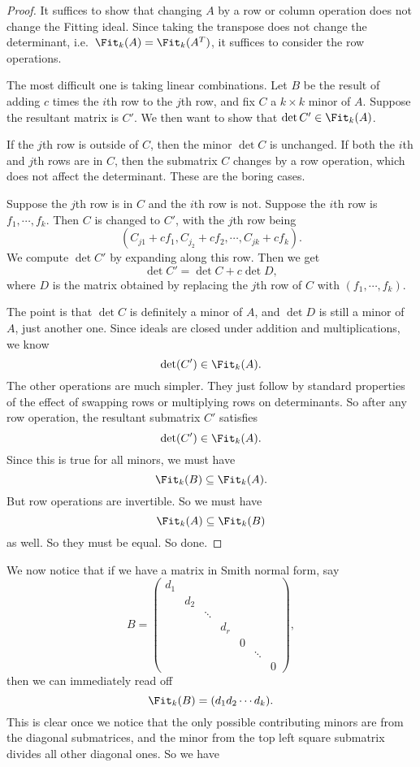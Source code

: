 \documentclass[a4paper]{article}
\begin{document}
\begin{proof}
  It suffices to show that changing $A$ by a row or column operation does not change the Fitting ideal. Since taking the transpose does not change the determinant, i.e.\ $\Fit_k(A) = \Fit_k(A^T)$, it suffices to consider the row operations.

  The most difficult one is taking linear combinations. Let $B$ be the result of adding $c$ times the $i$th row to the $j$th row, and fix $C$ a $k \times k$ minor of $A$. Suppose the resultant matrix is $C'$. We then want to show that $\det C' \in \Fit_k(A)$.

  If the $j$th row is outside of $C$, then the minor $\det C$ is unchanged. If both the $i$th and $j$th rows are in $C$, then the submatrix $C$ changes by a row operation, which does not affect the determinant. These are the boring cases.

  Suppose the $j$th row is in $C$ and the $i$th row is not. Suppose the $i$th row is $f_1, \cdots, f_k$. Then $C$ is changed to $C'$, with the $j$th row being
  \[
    (C_{j1} + c f_1, C_{j_2} + c f_2, \cdots, C_{jk} + c f_k).
  \]
  We compute $\det C'$ by expanding along this row. Then we get
  \[
    \det C'= \det C + c\det D,
  \]
  where $D$ is the matrix obtained by replacing the $j$th row of $C$ with $(f_1, \cdots, f_k)$.

  The point is that $\det C$ is definitely a minor of $A$, and $\det D$ is still a minor of $A$, just another one. Since ideals are closed under addition and multiplications, we know
  \[
    \det (C') \in \Fit_k(A).
  \]
  The other operations are much simpler. They just follow by standard properties of the effect of swapping rows or multiplying rows on determinants. So after any row operation, the resultant submatrix $C'$ satisfies
  \[
    \det (C') \in \Fit_k(A).
  \]
  Since this is true for all minors, we must have
  \[
    \Fit_k(B) \subseteq \Fit_k(A).
  \]
  But row operations are invertible. So we must have
  \[
    \Fit_k(A) \subseteq \Fit_k(B)
  \]
  as well. So they must be equal. So done.
\end{proof}

We now notice that if we have a matrix in Smith normal form, say
\[
  B =
  \begin{pmatrix}
    d_1\\
    & d_2\\
    & & \ddots\\
    & & & d_r\\
    & & & & 0\\
    & & & & & \ddots\\
    & & & & & & 0
  \end{pmatrix},
\]
then we can immediately read off
\[
  \Fit_k(B) = (d_1 d_2 \cdots d_k).
\]
This is clear once we notice that the only possible contributing minors are from the diagonal submatrices, and the minor from the top left square submatrix divides all other diagonal ones. So we have
\end{document}
